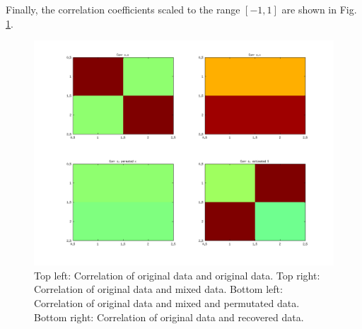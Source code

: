 \documentclass{article}
\begin{document}
		Finally, the correlation coefficients scaled to the range $[-1,1]$ are shown in Fig. \ref{fig:correlation}.
		\begin{figure}[H]
			\centering
			\includegraphics[width=12cm]{correlation.png}
			\caption{Top left: Correlation of original data and original data. Top right: Correlation of original data and mixed data. Bottom left: Correlation of original data and mixed and permutated data. Bottom right: Correlation of original data and recovered data.}
			\label{fig:correlation}
		\end{figure}
		
\end{document}
